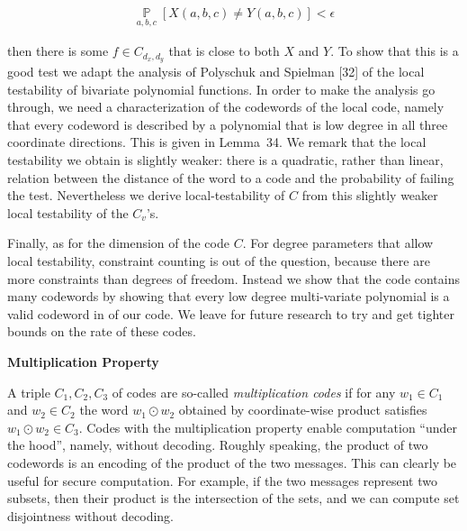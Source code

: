 \documentclass[10pt,a4paper]{article}
\begin{document}
\[\begin{gathered}
\operatorname*{\mathbb{P}}_{a,b,c}[X(a,b,c)\neq Y(a,b,c)]<\epsilon
\end{gathered}\]


then there is some $f\in C_{d_{x},d_{y}}$ that is close to both $X$ and $Y$.
To show that this is a good test we adapt the analysis of Polyschuk and Spielman [32] of the local testability of bivariate polynomial functions. In order to make the analysis go through, we need a characterization of the codewords of the local code, namely that every codeword is described by a polynomial that is low degree in all three coordinate directions. This is given in Lemma 34.
We remark that the local testability we obtain is slightly weaker: there is a quadratic, rather than linear, relation between the distance of the word to a code and the probability of failing the test. Nevertheless we derive local-testability of $C$ from this slightly weaker local testability of the $C_{v}$’s.\par




Finally, as for the dimension of the code $C$. For degree parameters that allow local testability, constraint counting is out of the question, because there are more constraints than degrees of freedom. Instead we show that the code contains many codewords by showing that every low degree multi-variate polynomial is a valid codeword in of our code. We leave for future research to try and get tighter bounds on the rate of these codes.\par




\par\medskip\noindent\textbf{Multiplication Property}\par




A triple $C_{1},C_{2},C_{3}$ of codes are so-called \emph{multiplication codes} if for any $w_{1}\in C_{1}$ and $w_{2}\in C_{2}$ the word $w_{1}\odot w_{2}$ obtained by coordinate-wise product satisfies $w_{1}\odot w_{2}\in C_{3}$. Codes with the multiplication property enable computation “under the hood”, namely, without decoding. Roughly speaking, the product of two codewords is an encoding of the product of the two messages. This can clearly be useful for secure computation. For example, if the two messages represent two subsets, then their product is the intersection of the sets, and we can compute set disjointness without decoding.\par
\end{document}
